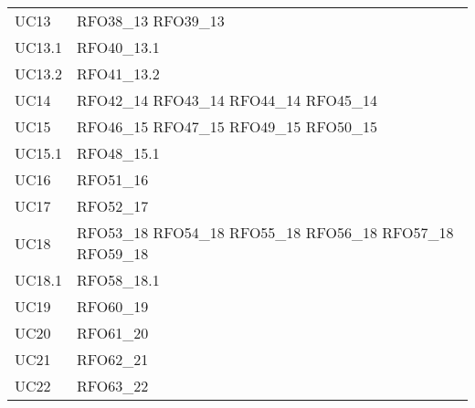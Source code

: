 \begin{longtable}{|C{6cm} C{6cm}|}
    UC13 & RFO38\_13 \newline RFO39\_13 \\
    UC13.1 & RFO40\_13.1 \\
    UC13.2 & RFO41\_13.2 \\
    UC14 & RFO42\_14 \newline RFO43\_14 \newline RFO44\_14 \newline RFO45\_14 \\
    UC15 & RFO46\_15 \newline RFO47\_15 \newline RFO49\_15 \newline RFO50\_15 \\
    UC15.1 & RFO48\_15.1 \\
    UC16 & RFO51\_16 \\
    UC17 & RFO52\_17 \\
    UC18 & RFO53\_18 \newline RFO54\_18 \newline RFO55\_18 \newline RFO56\_18 \newline RFO57\_18 \newline RFO59\_18 \\
    UC18.1 & RFO58\_18.1 \\
    UC19 & RFO60\_19 \\
    UC20 & RFO61\_20 \\
    UC21 & RFO62\_21 \\
    UC22 & RFO63\_22 \\

\end{longtable}
